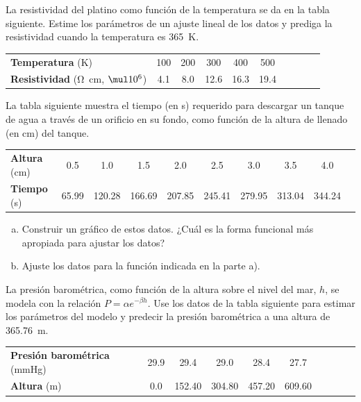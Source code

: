 \documentclass[11pt]{article}
\begin{document}
\begin{question} %
	La resistividad del platino como función de la temperatura se da en la tabla siguiente. Estime los parámetros de un ajuste lineal de los datos y prediga la resistividad cuando la temperatura es \qty{365}{\kelvin}.

	\begin{center}
		\begin{tabular}{lccccccccc}
			\toprule
			\textbf{Temperatura} (\unit{\kelvin})                          & 100 & 200 & 300  & 400  & 500  \\
			\textbf{Resistividad} (\unit{\ohm\centi\metre}, $\mul 10^{6}$) & 4.1 & 8.0 & 12.6 & 16.3 & 19.4 \\
			\bottomrule
		\end{tabular}
	\end{center}
\end{question}

\begin{question} %
	La tabla siguiente muestra el tiempo (en \unit{\second}) requerido para descargar un tanque de agua a través de un orificio en su fondo, como función de la altura de llenado (en \unit{\centi\metre}) del tanque.
	\begin{center}
		\begin{tabular}{lccccccccc}
			\toprule
			\textbf{Altura} (\unit{\centi\metre}) & 0.5   & 1.0    & 1.5    & 2.0    & 2.5    & 3.0    & 3.5    & 4.0    \\
			\textbf{Tiempo} (\unit{\second})      & 65.99 & 120.28 & 166.69 & 207.85 & 245.41 & 279.95 & 313.04 & 344.24 \\
			\bottomrule
		\end{tabular}
	\end{center}
	\begin{enumerate}[a)]
		\item Construir un gráfico de estos datos. ¿Cuál es la forma funcional más apropiada para ajustar los datos?
		\item Ajuste los datos para la función indicada en la parte a).
	\end{enumerate}
\end{question}

\begin{question} %
	La presión barométrica, como función de la altura sobre el nivel del mar, $h$, se modela con la relación $P = \alpha e^{-\beta h}$. Use los datos de la tabla siguiente para estimar los parámetros del modelo y predecir la presión barométrica a una altura de \qty{365.76}{m}.
	\begin{center}
		\begin{tabular}{lccccccccc}
			\toprule
			\textbf{Presión barométrica} (\unit{mmHg}) & 29.9 & 29.4   & 29.0   & 28.4   & 27.7   \\
			\textbf{Altura} (\unit{\metre})            & 0.0  & 152.40 & 304.80 & 457.20 & 609.60 \\
			\bottomrule
		\end{tabular}
	\end{center}
\end{question}
\end{document}
